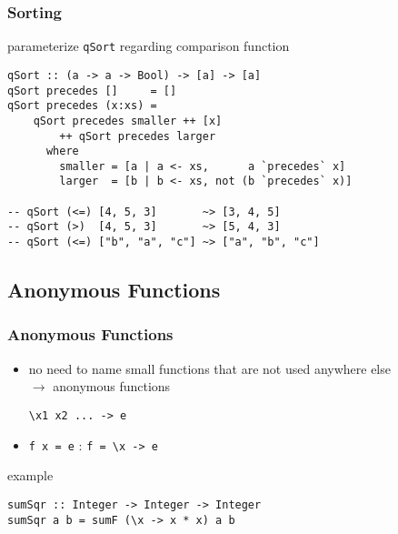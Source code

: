 \documentclass[dvipsnames]{beamer}
\theoremstyle{plain}
\begin{document}
\begin{frame}[fragile]
  \frametitle{Sorting}

  \begin{exampleblock}{parameterize \lstinline|qSort| regarding comparison
      function}
    \begin{lstlisting}
qSort :: (a -> a -> Bool) -> [a] -> [a]
qSort precedes []     = []
qSort precedes (x:xs) =
    qSort precedes smaller ++ [x]
        ++ qSort precedes larger
      where
        smaller = [a | a <- xs,      a `precedes` x]
        larger  = [b | b <- xs, not (b `precedes` x)]

-- qSort (<=) [4, 5, 3]       ~> [3, 4, 5]
-- qSort (>)  [4, 5, 3]       ~> [5, 4, 3]
-- qSort (<=) ["b", "a", "c"] ~> ["a", "b", "c"]
    \end{lstlisting}
  \end{exampleblock}
\end{frame}

\subsection{Anonymous Functions}

\begin{frame}[fragile]
  \frametitle{Anonymous Functions}

  \begin{itemize}
    \item no need to name small functions that are not used anywhere else\\
      $\rightarrow$ \alert{anonymous} functions
    \begin{lstlisting}[style=syntax]
\x1 x2 ... -> e
    \end{lstlisting}
    \item \lstinline|f x = e| \hspace{36pt} : \hspace{36pt} \lstinline|f = \x -> e|
  \end{itemize}

  \pause
  \medskip
  \begin{exampleblock}{example}
    \begin{lstlisting}
sumSqr :: Integer -> Integer -> Integer
sumSqr a b = sumF (\x -> x * x) a b
    \end{lstlisting}
  \end{exampleblock}
\end{frame}
\end{document}
